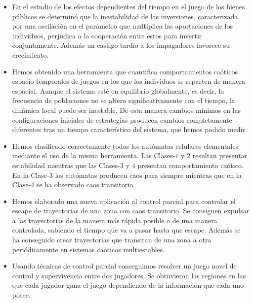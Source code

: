 \begin{itemize}

\item En el estudio de los efectos dependientes del tiempo en el juego de los bienes públicos se determinó que la inestabilidad de las inversiones, caracterizada por una oscilación en el parámetro que multiplica las aportaciones de los individuos, perjudica a la cooperación entre estos para invertir conjuntamente. Además un castigo tardío a los impagadores favorece su crecimiento.

\item  Hemos obtenido una herramienta que cuantifica comportamientos caóticos espacio-temporales de juegos en los que los individuos se reparten de manera espacial. Aunque el sistema esté en equilibrio globalmente, es decir, la frecuencia de poblaciones no se altera significativamente con el tiempo, la dinámica local puede ser inestable. De esta manera cambios mínimos en las configuraciones iniciales de estrategias producen cambios completamente diferentes tras un tiempo característico del sistema, que hemos podido medir.

\item Hemos clasificado correctamente todos los autómatas celulares elementales mediante el uso de la misma herramienta. Las Clases-$1$ y $2$ resultan presentar estabilidad mientras que las Clases-$3$ y $4$ presentan comportamiento caótico. En la Clase-$3$ los autómatas producen caos para siempre mientras que en la Clase-$4$ se ha observado caos transitorio.


\item Hemos elaborado una nueva aplicación al control parcial para controlar el escape de trayectorias de una zona con caos transitorio. Se consiguen expulsar a las trayectorias de la manera más rápida posible o de una manera controlada, sabiendo el tiempo que va a pasar hasta que escape. Además se ha conseguido crear trayectorias que transitan de una zona a otra periódicamente en sistemas caóticos multiestables.


\item  Usando técnicas de control parcial conseguimos resolver un juego novel de control y supervivencia entre dos jugadores. Se obtuvieron las regiones en las que cada jugador gana el juego dependiendo de la información que cada uno posee.



\end{itemize}
